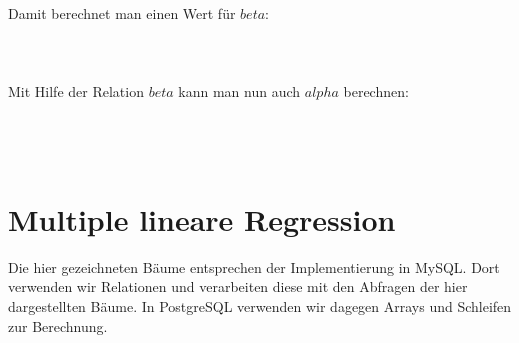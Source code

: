 Damit berechnet man einen Wert für $beta$:
\\\\
\noindent{}
\\\\
Mit Hilfe der Relation $beta$ kann man nun auch $alpha$ berechnen:
\\\\
\noindent{}
\\\\

\section{Multiple lineare Regression}
\label{section:5:2}

Die hier gezeichneten Bäume entsprechen der Implementierung in MySQL. Dort verwenden wir Relationen und verarbeiten diese mit den Abfragen der hier dargestellten Bäume. In PostgreSQL verwenden wir dagegen Arrays und Schleifen zur Berechnung.

